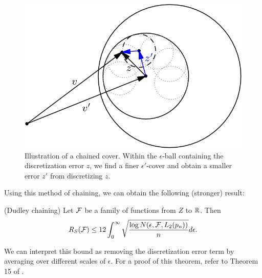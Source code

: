 \begin{figure}[H]
    \centering
    \includegraphics[scale = 0.4]{figures/chaining.png}
    \caption{Illustration of a chained cover. Within the $\epsilon$-ball containing the discretization error $z$, we find a finer $\epsilon'$-cover and obtain a smaller error $z'$ from discretizing $z$.}
    \label{lec8:fig:chained cover}
\end{figure}

Using this method of chaining, we can obtain the following (stronger) result:

\begin{theorem}(Dudley chaining)
Let $\mathcal F$ be a family of functions from $Z$ to $\mathbb R$. Then
\begin{equation}
R_S(\mathcal F) \le 12 \int_0^\infty \sqrt{ \frac{\log N(\epsilon, \mathcal F, L_2(p_n))} n } d\epsilon.
\end{equation}
\end{theorem}

We can interpret this bound as removing the discretization error term by averaging over different scales of $\epsilon$. For a proof of this theorem, refer to Theorem 15 of \cite{percynotes}.